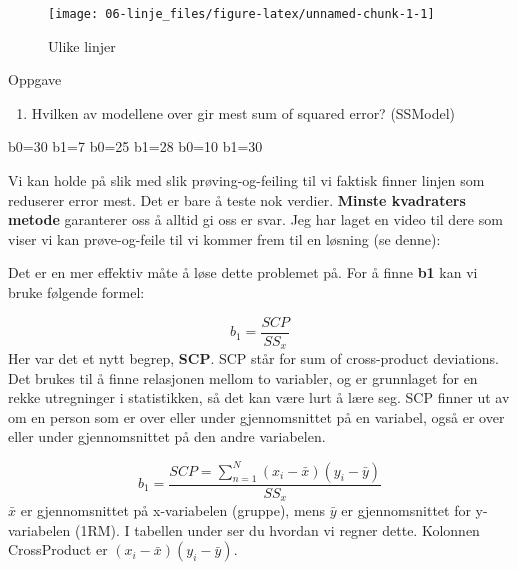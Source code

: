 \documentclass[
]{book}
\providecommand{\tightlist}{%
  \setlength{\itemsep}{0pt}\setlength{\parskip}{0pt}}
\begin{document}
\begin{figure}

{\centering \texttt{[image: 06-linje\_files/figure-latex/unnamed-chunk-1-1]} 

}

\caption{Ulike linjer}\label{fig:unnamed-chunk-1}
\end{figure}

{Oppgave}

\begin{enumerate}
\def\labelenumi{\alph{enumi})}
\tightlist
\item
  Hvilken av modellene over gir mest sum of squared error? (SSModel)
\end{enumerate}

b0=30 b1=7 b0=25 b1=28 b0=10 b1=30

Vi kan holde på slik med slik prøving-og-feiling til vi faktisk finner linjen som reduserer error mest. Det er bare å teste nok verdier. \textbf{Minste kvadraters metode} garanterer oss å alltid gi oss er svar. Jeg har laget en video til dere som viser vi kan prøve-og-feile til vi kommer frem til en løsning (se denne):

Det er en mer effektiv måte å løse dette problemet på. For å finne \textbf{b1} kan vi bruke følgende formel:

\[ b_1 = \frac{SCP}{SS_x} \]
Her var det et nytt begrep, \textbf{SCP}. SCP står for sum of cross-product deviations. Det brukes til å finne relasjonen mellom to variabler, og er grunnlaget for en rekke utregninger i statistikken, så det kan være lurt å lære seg. SCP finner ut av om en person som er over eller under gjennomsnittet på en variabel, også er over eller under gjennomsnittet på den andre variabelen.

\[ b_1 = \frac{SCP = \sum_{n=1}^N (x_i - \bar{x})(y_i - \bar{y})}{SS_x} \]
\(\bar{x}\) er gjennomsnittet på x-variabelen (gruppe), mens \(\bar{y}\) er gjennomsnittet for y-variabelen (1RM). I tabellen under ser du hvordan vi regner dette. Kolonnen CrossProduct er \((x_i - \bar{x})(y_i - \bar{y})\).
\end{document}
